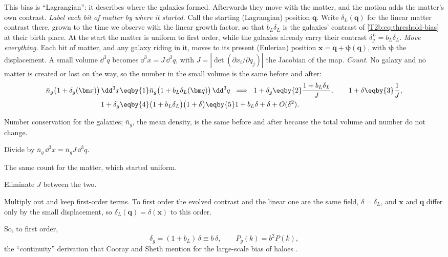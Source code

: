 This bias is ``Lagrangian'': it describes where the galaxies formed. Afterwards they move with the matter, and the motion adds the matter's own contrast. \emph{Label each bit of matter by where it started.} Call the starting (Lagrangian) position $\bm q$. Write $\delta_L(\bm q)$ for the linear matter contrast there, grown to the time we observe with the linear growth factor, so that $b_L\delta_L$ is the galaxies' contrast of \eqref{T2b:eq:threshold-bias} at their birth place. At the start the matter is uniform to first order, while the galaxies already carry their contrast $\delta_g^L=b_L\delta_L$. \emph{Move everything.} Each bit of matter, and any galaxy riding in it, moves to its present (Eulerian) position $\bm x=\bm q+\bm\psi(\bm q)$, with $\bm\psi$ the displacement. A small volume $\dd^3q$ becomes $\dd^3x=J\,\dd^3q$, with $J=|\det(\partial x_i/\partial q_j)|$ the Jacobian of the map. \emph{Count.} No galaxy and no matter is created or lost on the way, so the number in the small volume is the same before and after:
\begin{align}
  \bar n_g\big(1+\delta_g(\bm x)\big)\,\dd^3x
  &\eqby{1}\bar n_g\big(1+b_L\delta_L(\bm q)\big)\,\dd^3q
  \;\;\Longrightarrow\;\;
  1+\delta_g\eqby{2}\frac{1+b_L\delta_L}{J},\qquad
  1+\delta\eqby{3}\frac1J,\nonumber\\
  1+\delta_g
  &\eqby{4}\big(1+b_L\delta_L\big)\big(1+\delta\big)
  \eqby{5}1+b_L\delta+\delta+O(\delta^2).
  \label{T2b:eq:lagr-to-euler}
\end{align}
\begin{explain}
  \item Number conservation for the galaxies; $\bar n_g$, the mean density, is the same before and after because the total volume and number do not change.
  \item Divide by $\bar n_g\,\dd^3x=\bar n_g J\,\dd^3q$.
  \item The same count for the matter, which started uniform.
  \item Eliminate $J$ between the two.
  \item Multiply out and keep first-order terms. To first order the evolved contrast and the linear one are the same field, $\delta=\delta_L$, and $\bm x$ and $\bm q$ differ only by the small displacement, so $\delta_L(\bm q)=\delta(\bm x)$ to this order.
\end{explain}
So, to first order,
\begin{equation}
  \delta_g=(1+b_L)\,\delta\equiv b\,\delta ,\qquad P_g(k)=b^2P(k),
  \label{T2b:eq:eulerian-bias}
\end{equation}
the ``continuity'' derivation that Cooray and Sheth mention for the large-scale bias of haloes \cite[Sec.~3.3]{CooraySheth2002}.

